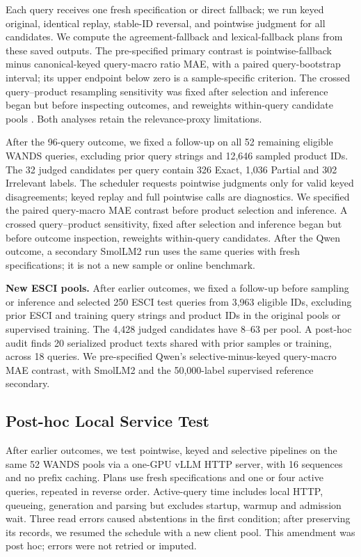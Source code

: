 \documentclass[conference]{IEEEtran}
\begin{document}
Each query receives one fresh specification or direct fallback; we run keyed original, identical replay, stable-ID reversal, and pointwise judgment for all candidates. We compute the agreement-fallback and lexical-fallback plans from these saved outputs. The pre-specified primary contrast is pointwise-fallback minus canonical-keyed query-macro ratio MAE, with a paired query-bootstrap interval; its upper endpoint below zero is a sample-specific criterion. The crossed query--product resampling sensitivity was fixed after selection and inference began but before inspecting outcomes, and reweights within-query candidate pools \cite{pigeonhole}. Both analyses retain the relevance-proxy limitations.

After the 96-query outcome, we fixed a follow-up on all 52 remaining eligible WANDS queries, excluding prior query strings and 12,646 sampled product IDs. The 32 judged candidates per query contain 326 Exact, 1,036 Partial and 302 Irrelevant labels. The scheduler requests pointwise judgments only for valid keyed disagreements; keyed replay and full pointwise calls are diagnostics. We specified the paired query-macro MAE contrast before product selection and inference. A crossed query--product sensitivity, fixed after selection and inference began but before outcome inspection, reweights within-query candidates. After the Qwen outcome, a secondary SmolLM2 run uses the same queries with fresh specifications; it is not a new sample or online benchmark.

\textbf{New ESCI pools.} After earlier outcomes, we fixed a follow-up before sampling or inference and selected 250 ESCI test queries from 3,963 eligible IDs, excluding prior ESCI and training query strings and product IDs in the original pools or supervised training. The 4,428 judged candidates have 8--63 per pool. A post-hoc audit finds 20 serialized product texts shared with prior samples or training, across 18 queries. We pre-specified Qwen's selective-minus-keyed query-macro MAE contrast, with SmolLM2 and the 50,000-label supervised reference secondary.

\subsection{Post-hoc Local Service Test}
After earlier outcomes, we test pointwise, keyed and selective pipelines on the same 52 WANDS pools via a one-GPU vLLM HTTP server, with 16 sequences and no prefix caching. Plans use fresh specifications and one or four active queries, repeated in reverse order. Active-query time includes local HTTP, queueing, generation and parsing but excludes startup, warmup and admission wait. Three read errors caused abstentions in the first condition; after preserving its records, we resumed the schedule with a new client pool. This amendment was post hoc; errors were not retried or imputed.
\end{document}
